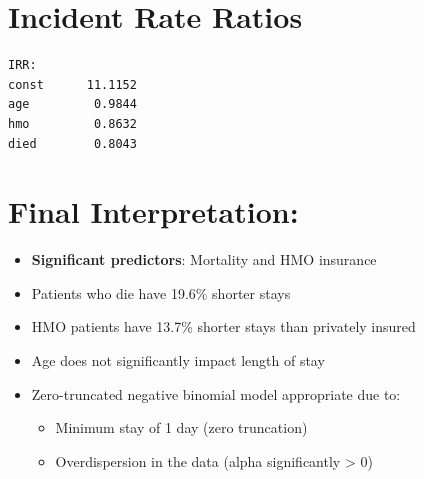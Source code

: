 \documentclass[12pt, a4paper]{article}
\begin{document}
\section*{Incident Rate Ratios}
\begin{outputbox}
\begin{verbatim}
IRR:
const      11.1152
age         0.9844
hmo         0.8632
died        0.8043
\end{verbatim}
\end{outputbox}

\section*{Final Interpretation:}
\begin{itemize}
    \item \textbf{Significant predictors}: Mortality and HMO insurance
    \item Patients who die have 19.6\% shorter stays
    \item HMO patients have 13.7\% shorter stays than privately insured
    \item Age does not significantly impact length of stay
    \item Zero-truncated negative binomial model appropriate due to:
        \begin{itemize}
            \item Minimum stay of 1 day (zero truncation)
            \item Overdispersion in the data (alpha significantly > 0)
        \end{itemize}
\end{itemize}
\end{document}

